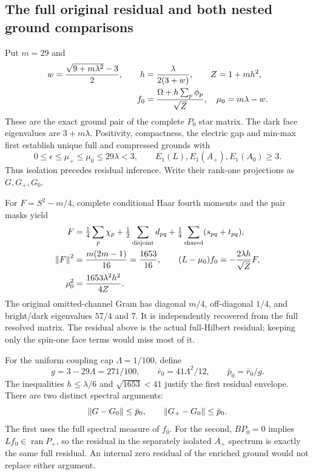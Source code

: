\subsection{The full original residual and both nested ground comparisons}
Put $m=29$ and
\begin{align}
 w=\frac{\sqrt{9+m\lambda^2}-3}{2},\qquad
 h&=\frac{\lambda}{2(3+w)},\qquad Z=1+mh^2,\notag\\
 f_0&=\frac{\Omega+h\sum_p\phi_p}{\sqrt Z},
 \quad\mu_0=m\lambda-w.
 \label{eq:ah1-ritz}
\end{align}
These are the exact ground pair of the complete $P_0$ star matrix. The dark face eigenvalues are $3+m\lambda$. Positivity, compactness, the electric gap and min-max first establish unique full and compressed grounds with
\begin{equation}
 0\le\epsilon\le\mu_+\le\mu_0\le29\lambda<3,
 \qquad E_1(L),E_1(A_+),E_1(A_0)\ge3.
 \label{eq:ah1-isolation}
\end{equation}
Thus isolation precedes residual inference. Write their rank-one projections as $G,G_+,G_0$.

For $F=S^2-m/4$, complete conditional Haar fourth moments and the pair masks yield
\begin{align}
 F&=\tfrac14\sum_p\chi_p+\tfrac12\sum_{\rm disjoint}d_{pq}
    +\tfrac14\sum_{\rm shared}(s_{pq}+t_{pq}),\notag\\
 \left\lVert F\right\rVert^2&=\frac{m(2m-1)}{16}=\frac{1653}{16},\qquad
 (L-\mu_0)f_0=-\frac{2\lambda h}{\sqrt Z}F,\notag\\
 \rho_0^2&=\frac{1653\lambda^2h^2}{4Z}.
 \label{eq:ah1-full-residual}
\end{align}
The original omitted-channel Gram has diagonal $m/4$, off-diagonal $1/4$, and bright/dark eigenvalues $57/4$ and $7$. It is independently recovered from the full resolved matrix. The residual above is the actual full-Hilbert residual; keeping only the spin-one face terms would miss most of it.

For the uniform coupling cap $\Lambda=1/100$, define
\begin{equation}
 g=3-29\Lambda=271/100,
 \qquad\bar r_0=41\Lambda^2/12,
 \qquad\bar p_0=\bar r_0/g.
\end{equation}
The inequalities $h\le\lambda/6$ and $\sqrt{1653}<41$ justify the first residual envelope. There are two distinct spectral arguments:
\begin{equation}
 \left\lVert G-G_0\right\rVert\le\bar p_0,
 \qquad\left\lVert G_+-G_0\right\rVert\le\bar p_0.
 \label{eq:ah1-two-p0}
\end{equation}
The first uses the full spectral measure of $f_0$. For the second, $BP_0=0$ implies $Lf_0\in\operatorname{ran}P_+$, so the residual in the separately isolated $A_+$ spectrum is exactly the same full residual. An internal zero residual of the enriched ground would not replace either argument.

